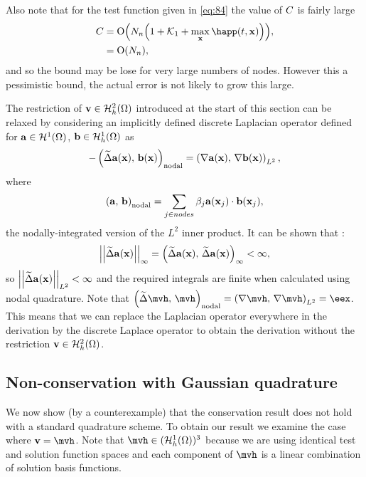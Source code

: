 Also note that for the test function given in \cref{eq:84} the value of $C$ is fairly large
\begin{equation}
  \begin{aligned}
    \sumbasiscoeff &= \order{N_n \bigb{1 + \kone + \max_{\xv} \happ(t, \xv)} }, \\
    &= \order{N_n},
  \end{aligned}
\end{equation}
and so the bound may be lose for very large numbers of nodes.
However this a pessimistic bound, the actual error is not likely to grow this large.

The restriction of $\boldsymbol{\mathrm{v}} \in \mathcal{H}_h^2(\Omega)$ introduced at the start of this section can be relaxed by considering an implicitly defined discrete Laplacian operator defined for ${\boldsymbol{\mathrm{a}}} \in \mathcal{H}^1(\Omega)$, ${\boldsymbol{\mathrm{b}}} \in {\mathcal{H}^1_h(\Omega)}$ as
\begin{equation}
  -\left(\widetilde{\Delta} {\boldsymbol{\mathrm{a}}}(\boldsymbol{\mathrm{x}}),\, {\boldsymbol{\mathrm{b}}}(\boldsymbol{\mathrm{x}}) \right)_{\textrm{nodal}} = \left(\nabla {\boldsymbol{\mathrm{a}}}(\boldsymbol{\mathrm{x}}),\, \nabla {\boldsymbol{\mathrm{b}}}(\boldsymbol{\mathrm{x}}) \right)_{{L^2}},
\end{equation}
where
\begin{equation}
  \left({\boldsymbol{\mathrm{a}}},\, {\boldsymbol{\mathrm{b}}} \right)_{\textrm{nodal}} = \sum_{j \in nodes} \beta_j {\boldsymbol{\mathrm{a}}}(\boldsymbol{\mathrm{x}}_j) \cdot {\boldsymbol{\mathrm{b}}}(\boldsymbol{\mathrm{x}}_j),
\end{equation}
\ie the nodally-integrated version of the $L^2$ inner product.
It can be shown that \cite{Bartels2007}:
\begin{equation}
  \left| \left| \widetilde{\Delta} {\boldsymbol{\mathrm{a}}}(\boldsymbol{\mathrm{x}}) \right| \right|_{\infty} = \left(\widetilde{\Delta} {\boldsymbol{\mathrm{a}}}(\boldsymbol{\mathrm{x}}),\, \widetilde{\Delta} {\boldsymbol{\mathrm{a}}}(\boldsymbol{\mathrm{x}}) \right)_\infty < \infty,
\end{equation}
so $\left| \left| \widetilde{\Delta} {\boldsymbol{\mathrm{a}}}(\boldsymbol{\mathrm{x}}) \right| \right|_{{L^2}} < \infty$ and the required integrals are finite when calculated using nodal quadrature.
Note that $\ip{\disclap \mvh}{\mvh}_\nodal = \ltip{\grad \mvh}{\grad \mvh} = \eex$.
This means that we can replace the Laplacian operator everywhere in the derivation by the discrete Laplace operator to obtain the derivation without the restriction $\boldsymbol{\mathrm{v}} \in \mathcal{H}_h^2(\Omega)$.

\subsection{Non-conservation with Gaussian quadrature}
\label{sec:non-cons-gaussian}

We now show (by a counterexample) that the conservation result does not hold with a standard quadrature scheme.
To obtain our result we examine the case where $\testv = \mvh$.
Note that $\mvh \in (\ts)^3$ because we are using identical test and solution function spaces and each component of $\mvh$ is a linear combination of solution basis functions.

